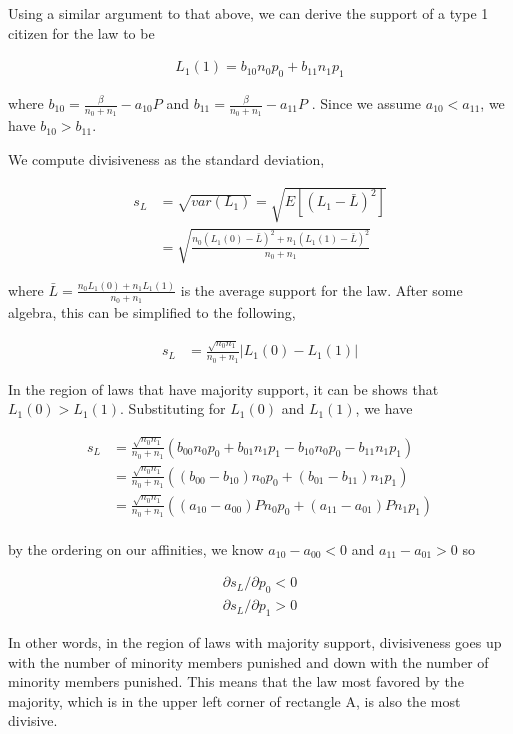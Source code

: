 Using a similar argument to that above, we can derive the support of a type 1 citizen for the law to be

\begin{align}
L_1(1) =  b_{10} n_0p_0 + b_{11}n_1p_1
\end{align}

where $b_{10} = \frac{\beta}{n_0 + n_1} -   a_{10}P$ and $b_{11} = \frac{\beta }{n_0 + n_1} -  a_{11}P $ .  Since we assume $a_{10} < a_{11}$, we have $b_{10} > b_{11}$.

We compute divisiveness as the standard deviation,

\begin{align}
s_L &= \sqrt{var(L_1)}  =  \sqrt{E\left[ \left(L_1 - \bar{L} \right)^2 \right] }  \\
&= \sqrt{ \frac{ n_0\left(L_1(0) - \bar{L}\right)^2 + n_1\left(L_1(1) - \bar{L} \right)^2 }{n_0+n_1}  }
\end{align}

where $\bar{L} = \frac{n_0 L_1(0) + n_1L_1(1) }{n_0 + n_1}$ is the average support for the law.  After some algebra, this can be simplified to the following,

\begin{align}
s_L &= \frac{\sqrt{n_0n_1}}{n_0 + n_1} \left| L_1(0) - L_1(1) \right|
\end{align}

In the region of laws that have majority support, it can be shows that $L_1(0) > L_1(1)$. Substituting for $L_1(0)$ and $L_1(1)$, we have

\begin{align}
s_L &= \frac{\sqrt{n_0n_1}}{n_0 + n_1} \left(  b_{00}n_0p_0 + b_{01} n_1p_1 - b_{10} n_0p_0 - b_{11}n_1p_1 \right) \\
&= \frac{\sqrt{n_0n_1}}{n_0 + n_1} \left(  ( b_{00} - b_{10} )n_0p_0 + ( b_{01} - b_{11})n_1p_1 \right) \\
&= \frac{\sqrt{n_0n_1}}{n_0 + n_1} \left(  ( a_{10} - a_{00} )P n_0p_0 + ( a_{11} - a_{01})P n_1p_1 \right) \\
\end{align}

by the ordering on our affinities, we know $a_{10} - a_{00}  < 0$ and $a_{11} - a_{01} > 0$ so

\begin{align}
\partial s_L / \partial p_0 <0 \\
\partial s_L / \partial p_1 >0
\end{align}

In other words, in the region of laws with majority support, divisiveness goes up with the number of minority members punished and down with the number of minority members punished.  This means that the law most favored by the majority, which is in the upper left corner of rectangle A, is also the most divisive.

